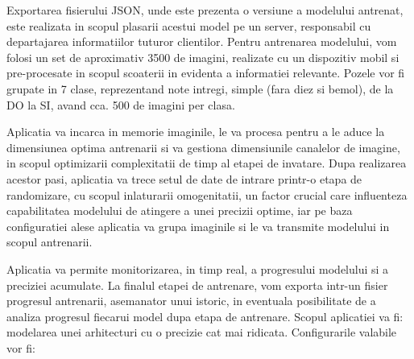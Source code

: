 	Exportarea fisierului JSON, unde este prezenta o versiune a modelului antrenat, este realizata in scopul plasarii acestui model pe un server, responsabil cu departajarea informatiilor tuturor clientilor. 
	Pentru antrenarea modelului, vom folosi un set de aproximativ 3500 de imagini, realizate cu un dispozitiv mobil si pre-procesate in scopul scoaterii in evidenta a informatiei relevante. Pozele vor fi grupate in  7 clase, reprezentand note intregi, simple (fara diez si bemol), de la DO la SI, avand cca. 500 de imagini per clasa. 
	
	Aplicatia va incarca in memorie imaginile, le va procesa pentru a le aduce la dimensiunea optima antrenarii si va gestiona dimensiunile canalelor de imagine, in scopul optimizarii complexitatii de timp al etapei de invatare. Dupa realizarea acestor pasi, aplicatia va trece setul de date de intrare printr-o etapa de randomizare, cu scopul inlaturarii omogenitatii, un factor crucial care influenteza capabilitatea modelului de atingere a unei precizii optime, iar pe baza configuratiei alese aplicatia va grupa imaginile si le va transmite modelului in scopul antrenarii.
	
	Aplicatia va permite monitorizarea, in timp real, a progresului modelului si a preciziei acumulate. La finalul etapei de antrenare, vom exporta intr-un fisier progresul antrenarii, asemanator unui istoric, in eventuala posibilitate de a analiza progresul fiecarui model dupa etapa de antrenare.
	Scopul aplicatiei va fi: modelarea unei arhitecturi cu o precizie cat mai ridicata.
	Configurarile valabile vor fi:
	
